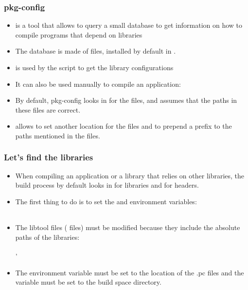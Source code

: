 \begin{frame}
  \frametitle{pkg-config}
  \begin{itemize}
  \item {} is a tool that allows to query a small
    database to get information on how to compile programs that depend
    on libraries
  \item The database is made of  files, installed by default in
    .
  \item {} is used by the  script to get the
    library configurations
  \item It can also be used manually to compile an application:\\
  \item By default, pkg-config looks in  for
    the  files, and assumes that the paths in these files
    are correct.
  \item {} allows to set another location for the
     files and  to prepend a
    prefix to the paths mentioned in the  files.
  \end{itemize}
\end{frame}

\begin{frame}
  \frametitle{Let's find the libraries}
  \begin{itemize}
  \item When compiling an application or a library that relies on
    other libraries, the build process by default looks in
     for libraries and  for headers.
  \item The first thing to do is to set the  and
     environment
    variables:\\
    \\
  \item The libtool files ( files) must be modified because they
    include the absolute paths of the libraries:\\
    \\
    '
  \item The  environment variable must be set to
    the location of the .pc files and the
     variable must be set to the build
    space directory.
\end{itemize}
\end{frame}

